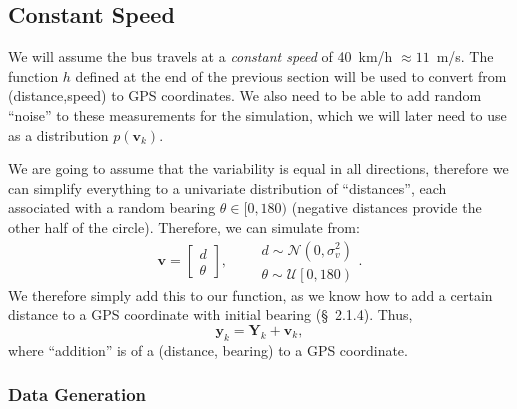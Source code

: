 \documentclass[11pt]{article}\usepackage[]{graphicx}\usepackage[]{color}
\newcommand{\by}{\boldsymbol{y}}
\newcommand{\bY}{\boldsymbol{Y}}
\newcommand{\bv}{\boldsymbol{v}}
\begin{document}
\subsection{Constant Speed}

We will assume the bus travels at a \emph{constant speed} of 40~km/h $\approx 11$~m/s.
The function $h$ defined at the end of the previous section will be used to convert from (distance,speed)
to GPS coordinates.
We also need to be able to add random ``noise'' to these measurements for the simulation, 
which we will later need to use as a distribution $p(\bv_k)$.

We are going to assume that the variability is equal in all directions, therefore we can simplify everything
to a univariate distribution of ``distances'', each associated with a random bearing $\theta\in[0,180)$ 
(negative distances provide the other half of the circle).
Therefore, we can simulate from:
\begin{equation*}
  \bv = 
  \begin{bmatrix}
    d \\ \theta
  \end{bmatrix},\qquad
  \begin{matrix}
    d\sim \mathcal{N}\left(0,\sigma_v^2\right)\\
    \theta \sim \mathcal{U}\left[0,180\right)
  \end{matrix}.
\end{equation*}
We therefore simply add this to our function, as we know how to add a certain distance to a GPS 
coordinate with initial bearing (\S~2.1.4). Thus,
\begin{equation}
  \label{eq:observation_}
  \by_k = \bY_k + \bv_k,
\end{equation}
where ``addition'' is of a (distance, bearing) to a GPS coordinate.


\subsubsection{Data Generation}
\end{document}
